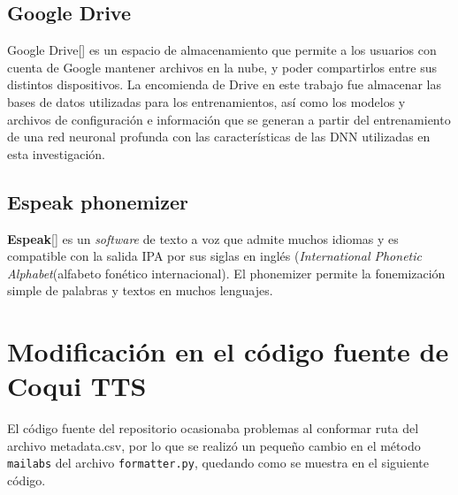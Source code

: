 \subsection{Google Drive}
Google Drive[\cite{drive}] es un espacio de almacenamiento que permite a los usuarios con cuenta de Google mantener archivos en la nube, y poder compartirlos entre sus distintos dispositivos. La encomienda de Drive en este trabajo fue almacenar las bases de datos utilizadas para los entrenamientos, así como los modelos y archivos de configuración e información que se generan a partir del entrenamiento de una red neuronal profunda con las características de las DNN utilizadas en esta investigación.

\subsection{Espeak phonemizer}
\textbf{Espeak}[\cite{espeak}] es un \textit{software} de texto a voz que admite muchos idiomas y  es compatible con la salida IPA por sus siglas en inglés (\textit{International Phonetic Alphabet}(alfabeto fonético internacional).
El phonemizer permite la fonemización simple de palabras y textos en muchos lenguajes.

\section{Modificación en el código fuente de Coqui TTS}
El código fuente del repositorio ocasionaba problemas al conformar ruta del archivo metadata.csv, por lo que se realizó un pequeño cambio en el método \texttt{mailabs} del archivo \texttt{formatter.py}, quedando como se muestra en el siguiente código.


